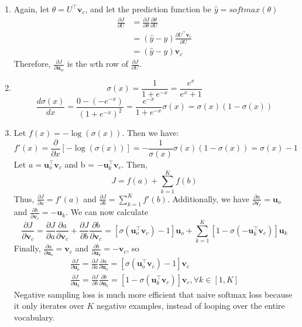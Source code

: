 \documentclass{article}
\begin{document}
\begin{enumerate}[label=(\alph*)]
    \item
    Again, let $\theta = U^\top \mathbf{v}_c$, and let the prediction function be $\hat{y} = softmax(\theta)$
    \begin{align*}
    \frac{\partial J}{\partial U} &= \frac{\partial J}{\partial \theta}\frac{\partial \theta}{\partial U}
    \\ &= (\hat{y} - y)\frac{\partial U^\top \mathbf{v}_c}{\partial U}
    \\ &= (\hat{y} - y)\mathbf{v}_c
    \end{align*}
    Therefore, $\frac{\partial J}{\partial \mathbf{u}_w}$ is the $w$th row of $\frac{\partial J}{\partial U}$.
    
    \item
    \[
    \sigma(x) = \frac{1}{1 + e^{-x}} = \frac{e^x}{e^x + 1}
    \]
    \[
        \frac{d\sigma(x)}{dx} = \frac{0 - (-e^{-x})}{(1 + e^{-x})^2} = \frac{e^{-x}}{1 + e^{-x}}\sigma(x) = \sigma(x)(1 - \sigma(x))
    \]
    
    \item
    Let $f(x) = -\log(\sigma(x))$.
    Then we have:
    \[
    f'(x) = \frac{\partial}{\partial x}[-\log(\sigma(x))]
    = -\frac{1}{\sigma(x)}\sigma(x)(1-\sigma(x))
    = \sigma(x) - 1
    \]
    Let $a = \mathbf{u}_o^\top \mathbf{v}_c$ and b = $-\mathbf{u}_k^\top \mathbf{v}_c$. Then,
    \[
    J = f(a) + \sum_{k=1}^K f(b)
    \]
    Thus, $\frac{\partial J}{\partial a} = f'(a)$ and $\frac{\partial J}{\partial b} = \sum_{k=1}^K f'(b)$. Additionally, we have $\frac{\partial a}{\partial \mathbf{v}_c} = \mathbf{u}_o$ and $\frac{\partial b}{\partial \mathbf{v}_c} = -\mathbf{u}_k$.
    We can now calculate
    \[
    \frac{\partial J}{\partial \mathbf{v}_c} = \frac{\partial J}{\partial a} \frac{\partial a}{\partial \mathbf{v}_c} + \frac{\partial J}{\partial b} \frac{\partial b}{\partial \mathbf{v}_c} 
    = [\sigma(\mathbf{u}_o^\top \mathbf{v}_c) - 1]\mathbf{u}_o + \sum_{k=1}^K [1 - \sigma(-\mathbf{u}_k^\top \mathbf{v}_c)]\mathbf{u}_k
    \]
    Finally, $\frac{\partial a}{\partial \mathbf{u}_o} = \mathbf{v}_c$ and $\frac{\partial b}{\partial \mathbf{u}_k} = -\mathbf{v}_c$, so
    \begin{gather*}
    \frac{\partial J}{\partial \mathbf{u}_o}
    = \frac{\partial J}{\partial a} \frac{\partial a}{\partial \mathbf{u}_o} = [\sigma(\mathbf{u}_o^\top \mathbf{v}_c) - 1]\mathbf{v}_c
    \\
    \frac{\partial J}{\partial \mathbf{u}_k}
    = \frac{\partial J}{\partial b} \frac{\partial b}{\partial \mathbf{u}_k}
    = [1 - \sigma(\mathbf{u}_k^\top \mathbf{v}_c)]\mathbf{v}_c, \forall k \in [1, K]
    \end{gather*}
    Negative sampling loss is much more efficient that naive softmax loss because it only iterates over $K$ negative examples, instead of looping over the entire vocabulary.
    

\end{enumerate}
\end{document}
